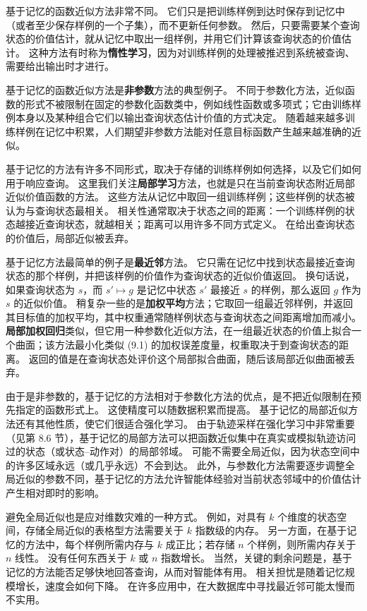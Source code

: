 \documentclass[UTF8, 12pt, fontset=fandol, oneside]{ctexart}
\begin{document}
基于记忆的函数近似方法非常不同。
它们只是把训练样例到达时保存到记忆中（或者至少保存样例的一个子集），而不更新任何参数。
然后，只要需要某个查询状态的价值估计，就从记忆中取出一组样例，并用它们计算该查询状态的价值估计。
这种方法有时称为\textbf{惰性学习}，因为对训练样例的处理被推迟到系统被查询、需要给出输出时才进行。

基于记忆的函数近似方法是\textbf{非参数}方法的典型例子。
不同于参数化方法，近似函数的形式不被限制在固定的参数化函数类中，例如线性函数或多项式；它由训练样例本身以及某种组合它们以输出查询状态估计价值的方式决定。
随着越来越多训练样例在记忆中积累，人们期望非参数方法能对任意目标函数产生越来越准确的近似。

基于记忆的方法有许多不同形式，取决于存储的训练样例如何选择，以及它们如何用于响应查询。
这里我们关注\textbf{局部学习}方法，也就是只在当前查询状态附近局部近似价值函数的方法。
这些方法从记忆中取回一组训练样例；这些样例的状态被认为与查询状态最相关。
相关性通常取决于状态之间的距离：一个训练样例的状态越接近查询状态，就越相关；距离可以用许多不同方式定义。
在给出查询状态的价值后，局部近似被丢弃。

基于记忆方法最简单的例子是\textbf{最近邻}方法。
它只需在记忆中找到状态最接近查询状态的那个样例，并把该样例的价值作为查询状态的近似价值返回。
换句话说，如果查询状态为 $s$，而 $s'\mapsto g$ 是记忆中状态 $s'$ 最接近 $s$ 的样例，那么返回 $g$ 作为 $s$ 的近似价值。
稍复杂一些的是\textbf{加权平均}方法；它取回一组最近邻样例，并返回其目标值的加权平均，其中权重通常随样例状态与查询状态之间距离增加而减小。
\textbf{局部加权回归}类似，但它用一种参数化近似方法，在一组最近状态的价值上拟合一个曲面；该方法最小化类似 (9.1) 的加权误差度量，权重取决于到查询状态的距离。
返回的值是在查询状态处评价这个局部拟合曲面，随后该局部近似曲面被丢弃。

由于是非参数的，基于记忆的方法相对于参数化方法的优点，是不把近似限制在预先指定的函数形式上。
这使精度可以随数据积累而提高。
基于记忆的局部近似方法还有其他性质，使它们很适合强化学习。
由于轨迹采样在强化学习中非常重要（见第 8.6 节），基于记忆的局部方法可以把函数近似集中在真实或模拟轨迹访问过的状态（或状态--动作对）的局部邻域。
可能不需要全局近似，因为状态空间中的许多区域永远（或几乎永远）不会到达。
此外，与参数化方法需要逐步调整全局近似的参数不同，基于记忆的方法允许智能体经验对当前状态邻域中的价值估计产生相对即时的影响。

避免全局近似也是应对维数灾难的一种方式。
例如，对具有 $k$ 个维度的状态空间，存储全局近似的表格型方法需要关于 $k$ 指数级的内存。
另一方面，在基于记忆的方法中，每个样例所需内存与 $k$ 成正比；若存储 $n$ 个样例，则所需内存关于 $n$ 线性。
没有任何东西关于 $k$ 或 $n$ 指数增长。
当然，关键的剩余问题是，基于记忆的方法能否足够快地回答查询，从而对智能体有用。
相关担忧是随着记忆规模增长，速度会如何下降。
在许多应用中，在大数据库中寻找最近邻可能太慢而不实用。
\end{document}
